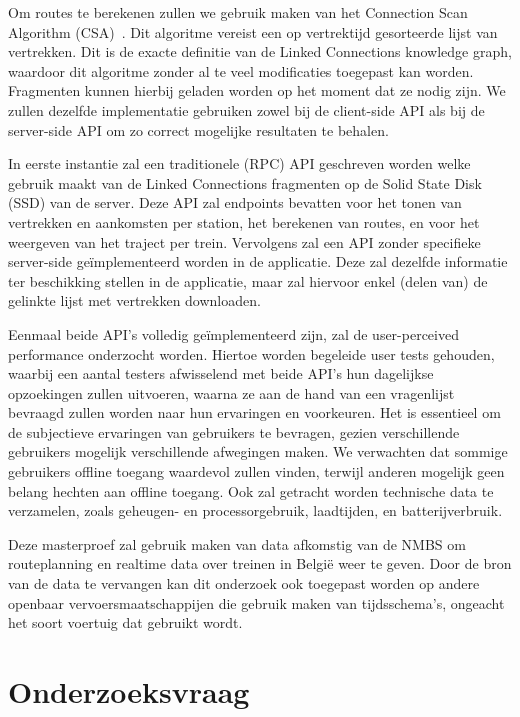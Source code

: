 Om routes te berekenen zullen we gebruik maken van het Connection Scan Algorithm (CSA)~\citep{strasser13,strasser14,strasser17}. Dit algoritme vereist een op vertrektijd gesorteerde lijst van vertrekken. Dit is de exacte definitie van de Linked Connections knowledge graph, waardoor dit algoritme zonder al te veel modificaties toegepast kan worden. Fragmenten kunnen hierbij geladen worden op het moment dat ze nodig zijn. We zullen dezelfde implementatie gebruiken zowel bij de client-side API als bij de server-side API om zo correct mogelijke resultaten te behalen. 

In eerste instantie zal een traditionele (RPC) API geschreven worden welke gebruik maakt van de Linked Connections fragmenten op de Solid State Disk (SSD) van de server. Deze API zal endpoints bevatten voor het tonen van vertrekken en aankomsten per station, het berekenen van routes, en voor het weergeven van het traject per trein. 
Vervolgens zal een API zonder specifieke server-side geïmplementeerd worden in de applicatie. Deze zal dezelfde informatie ter beschikking stellen in de applicatie, maar zal hiervoor enkel (delen van) de gelinkte lijst met vertrekken downloaden. 

Eenmaal beide API's volledig geïmplementeerd zijn, zal de user-perceived performance onderzocht worden. Hiertoe worden begeleide user tests gehouden, waarbij een aantal testers afwisselend met beide API's hun dagelijkse opzoekingen zullen uitvoeren, waarna ze aan de hand van een vragenlijst bevraagd zullen worden naar hun ervaringen en voorkeuren. Het is essentieel om de subjectieve ervaringen van gebruikers te bevragen, gezien verschillende gebruikers mogelijk verschillende afwegingen maken. We verwachten dat sommige gebruikers offline toegang waardevol zullen vinden, terwijl anderen mogelijk geen belang hechten aan offline toegang. Ook zal getracht worden technische data te verzamelen, zoals geheugen- en processorgebruik, laadtijden, en batterijverbruik. 

Deze masterproef zal gebruik maken van data afkomstig van de NMBS om routeplanning en realtime data over treinen in België weer te geven. Door de bron van de data te vervangen kan dit onderzoek ook toegepast worden op andere openbaar vervoersmaatschappijen die gebruik maken van tijdsschema's, ongeacht het soort voertuig dat gebruikt wordt.

\section{Onderzoeksvraag}
\label{sec:onderzoeksvraag}
 
